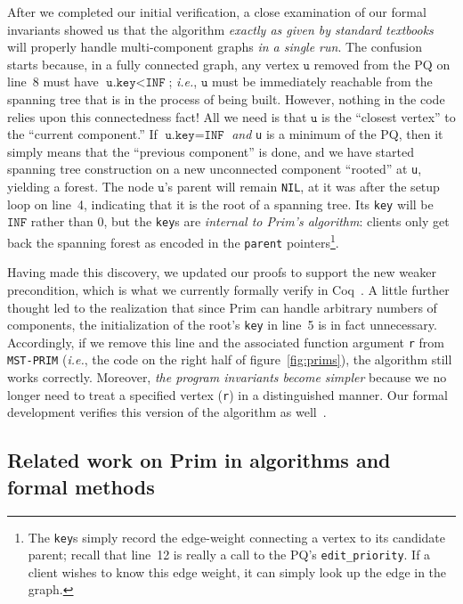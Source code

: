 After we completed our initial verification, a close examination of our formal invariants showed us that the algorithm \emph{exactly as given by standard textbooks} will properly handle multi-component graphs \textit{in a single run}.  The confusion starts because, in a fully connected graph, any vertex $\texttt{u}$ removed from the PQ on line~8 must have $\texttt{u.key} < \texttt{INF}$; \emph{i.e.}, $\texttt{u}$ must be immediately reachable from the spanning tree that is in the process of being built.  However, nothing in the code relies upon this connectedness fact!  All we need is that $\texttt{u}$ is the ``closest vertex'' to the ``current component.''  If $\texttt{u.key}=\texttt{INF}$ \emph{and} \texttt{u} is a minimum of the PQ, then it simply means that the ``previous component'' is done, and we have started spanning tree construction on a new unconnected component ``rooted'' at \texttt{u}, yielding a forest.  The node $\texttt{u}$'s parent will remain \texttt{NIL}, at it was after the setup loop on line~4, indicating that it is the root of a spanning tree.  Its \texttt{key} will be $\texttt{INF}$ rather than $0$, but the \texttt{key}s are \emph{internal to Prim's algorithm}: clients only get back the spanning forest as encoded in the \texttt{parent} pointers\footnote{The \texttt{key}s simply record the edge-weight connecting a vertex to its candidate parent; recall that line~12 is really a call to the PQ's \texttt{edit\_priority}.  If a client wishes to know this edge weight, it can simply look up the edge in the graph.}.

Having made this discovery, we updated our proofs to support the new weaker precondition, which is what we currently formally verify in Coq~\cite{Coq}.
A little further thought led to the realization that since Prim can handle arbitrary numbers of components, the initialization of the root's \texttt{key} in line~5 is in fact unnecessary.  Accordingly, if we remove this line and the associated function argument \texttt{r} from \texttt{MST-PRIM} (\emph{i.e.}, the code on the right half of figure~\ref{fig:prims}), the algorithm still works correctly.  Moreover, \emph{the program invariants become simpler} because we no longer need to treat a specified vertex (\texttt{r}) in a distinguished manner.  Our formal development verifies this version of the algorithm as well~\cite{anonrepo}.

\subsection{Related work on Prim in algorithms and formal methods}
\label{sec:relworkprim}

